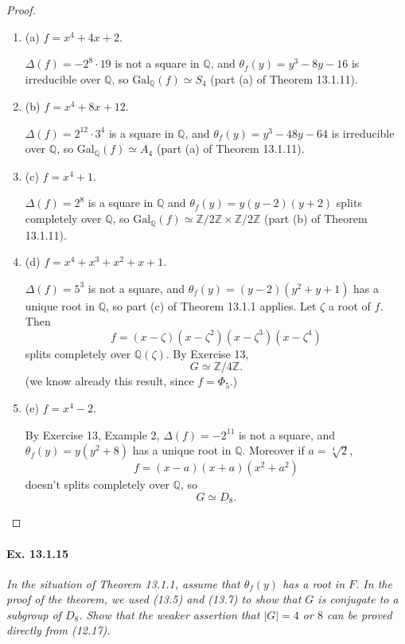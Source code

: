 \documentclass[11pt,a4paper]{article}
\newcommand{\be} {\begin{enumerate}}
\newcommand{\ee} {\end{enumerate}}
\newcommand{\Q}{\mathbb{Q}}
\newcommand{\Z}{\mathbb{Z}}
\newcommand{\Gal}{\mathrm{Gal}}
\begin{document}
\begin{proof}
\be
\item[(a)] $f = x^4+4x+2$.

$\Delta(f) = -2^8\cdot 19$ is  not a square in $\Q$, and $\theta_f(y) = y^3 -8y - 16$ is irreducible over $\Q$, so $\Gal_\Q(f) \simeq S_4$ (part (a) of Theorem 13.1.11).


\item[(b)] $f = x^4 + 8x+12$.

$\Delta(f) = 2^{12}\cdot 3^4$ is  a square in $\Q$, and $\theta_f(y) = y^3 -48y - 64$ is irreducible over $\Q$, so $\Gal_\Q(f) \simeq A_4$ (part (a) of Theorem 13.1.11).

\item[(c)] $f = x^4+1$.

$\Delta(f) = 2^8$ is a square in $\Q$ and $\theta_f(y) = y(y-2)(y+2)$ splits completely over $\Q$, so $\Gal_\Q(f) \simeq \Z/2\Z \times \Z/2\Z$  (part (b) of Theorem 13.1.11).

\item[(d)] $f = x^4 + x^3+x^2+x+1$.

$\Delta(f) = 5^3$ is not a square, and $\theta_f(y) = (y-2)(y^2+y+1)$ has a unique root in $\Q$, so part (c) of Theorem 13.1.1 applies.
Let $\zeta$ a root of $f$. Then
$$f = (x-\zeta)(x-\zeta^2)(x-\zeta^3)(x-\zeta^4)$$
splits completely over $\Q(\zeta)$. By Exercise 13,
$$G \simeq \Z/4\Z.$$
(we know already this result, since $f = \Phi_5$.)

\item[(e)] $f = x^4-2$.

By Exercise 13, Example 2, $\Delta(f) = -2^{11}$ is not a square, and $\theta_f(y) = y(y^2+8)$ has a unique root in $\Q$. Moreover if $a = \sqrt[4]{2}$,
$$f = (x-a)(x+a)(x^2+a^2)$$ doesn't splits completely over $\Q$, so
$$G \simeq D_8.$$
\ee
\end{proof}

\paragraph{Ex. 13.1.15}

{\it In the situation of Theorem 13.1.1, assume that $\theta_f(y)$ has a root in $F$. In the proof of the theorem, we used (13.5) and (13.7) to show that $G$ is conjugate to a subgroup of $D_8$. Show that the weaker assertion that $|G| = 4$ or $8$ can be proved directly from (12.17).
}
\end{document}
